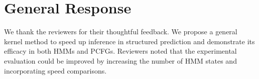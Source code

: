 \documentclass{article}
\begin{document}


\section{General Response}
We thank the reviewers for their thoughtful feedback. We propose a general kernel method to speed up inference in structured prediction and demonstrate its efficacy in both HMMs and PCFGs. Reviewers noted that the experimental evaluation could be improved by increasing the number of HMM states and incorporating speed comparisons. 


\end{document}
